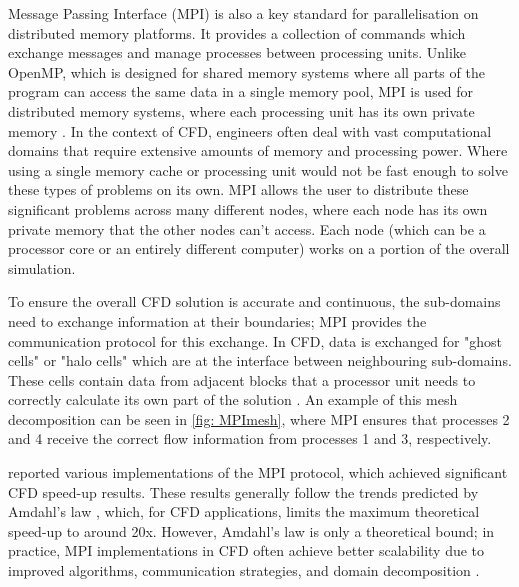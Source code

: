 Message Passing Interface (MPI) is also a key standard for parallelisation on distributed memory platforms. It provides a collection of commands which exchange messages and manage processes between processing units. Unlike OpenMP, which is designed for shared memory systems where all parts of the program can access the same data in a single memory pool, MPI is used for distributed memory systems, where each processing unit has its own private memory \cite{Giovannini2015}. In the context of CFD, engineers often deal with vast computational domains that require extensive amounts of memory and processing power. Where using a single memory cache or processing unit would not be fast enough to solve these types of problems on its own. MPI allows the user to distribute these significant problems across many different nodes, where each node has its own private memory that the other nodes can't access. Each node (which can be a processor core or an entirely different computer) works on a portion of the overall simulation. 

To ensure the overall CFD solution is accurate and continuous, the sub-domains need to exchange information at their boundaries; MPI provides the communication protocol for this exchange. In CFD, data is exchanged for "ghost cells" or "halo cells" which are at the interface between neighbouring sub-domains. These cells contain data from adjacent blocks that a processor unit needs to correctly calculate its own part of the solution \cite{Afzal2017, Giovannini2015}. An example of this mesh decomposition can be seen in \autoref{fig: MPImesh}, where MPI ensures that processes 2 and 4 receive the correct flow information from processes 1 and 3, respectively. 


\textcite{Afzal2017} reported various implementations of the MPI protocol, which achieved significant CFD speed-up results. These results generally follow the trends predicted by Amdahl’s law \cite{Amdahl1967}, which, for CFD applications, limits the maximum theoretical speed-up to around 20x. However, Amdahl’s law is only a theoretical bound; in practice, MPI implementations in CFD often achieve better scalability due to improved algorithms, communication strategies, and domain decomposition \cite{Giovannini2015, Hadade2016}.



